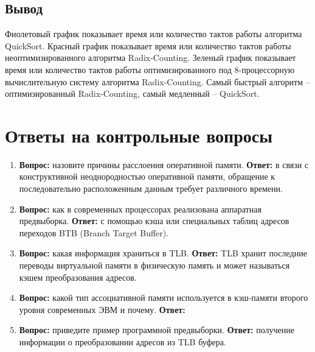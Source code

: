 \documentclass{article}
\begin{document}
\subsection{Вывод}
Фиолетовый график показывает время или количество тактов работы алгоритма QuickSort. Красный график показывает время
или количество тактов работы неоптимизированного алгоритма Radix-Counting. Зеленый график показывает время или
количество тактов работы оптимизированного под 8-процессорную вычислительную систему алгоритма Radix-Counting.
Самый быстрый алгоритм -- оптимизированный Radix-Counting, самый медленный -- QuickSort.

\clearpage\section{Ответы на контрольные вопросы}
\begin{enumerate}
	\item \textbf{Вопрос:} назовите причины расслоения оперативной памяти. \textbf{Ответ:} в связи с конструктивной
неоднородностью оперативной памяти, обращение к последовательно расположенным данным требует различного времени.
	\item \textbf{Вопрос:} как в современных процессорах реализована аппаратная предвыборка. \textbf{Ответ:} с помощью
кэша или  специальных таблиц адресов переходов BTB (Branch Target Buffer).
	\item \textbf{Вопрос:} какая информация храниться в TLB. \textbf{Ответ:} TLB хранит последние переводы виртуальной
памяти в физическую память и может называться кэшем преобразования адресов.
	\item \textbf{Вопрос:} какой тип ассоциативной памяти используется в кэш-памяти второго уровня современных ЭВМ и
почему. \textbf{Ответ:}
	\item \textbf{Вопрос:} приведите пример программной предвыборки. \textbf{Ответ:} получение информации о
преобразовании адресов из TLB буфера.
\end{enumerate}
\end{document}
